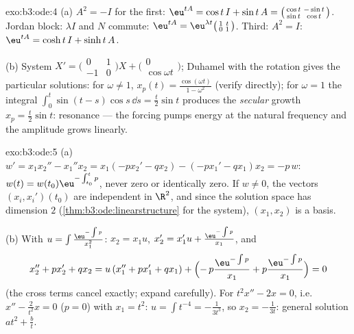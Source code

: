 \begin{solution}{exo:b3:ode:4}
(a) $A^2 = -I$ for the first: $\eu^{tA} = \cos t\,I + \sin
t\,A = \bigl(\begin{smallmatrix}\cos t & -\sin t\\ \sin t &
\cos t\end{smallmatrix}\bigr)$. Jordan block: $\lambda I$ and
$N$ commute: $\eu^{tA} =
\eu^{\lambda t}\bigl(\begin{smallmatrix}1 & t\\ 0 &
1\end{smallmatrix}\bigr)$. Third: $A^2 = I$: $\eu^{tA} =
\cosh t\,I + \sinh t\,A$.

(b) System $X' = \bigl(\begin{smallmatrix}0&1\\-1&0
\end{smallmatrix}\bigr)X + \bigl(\begin{smallmatrix}0\\
\cos\omega t\end{smallmatrix}\bigr)$; Duhamel with the
rotation  gives the particular solutions: for
$\omega \neq 1$, $x_p(t) = \frac{\cos(\omega t)}{1 -
\omega^2}$ (verify directly); for $\omega = 1$ the integral
$\int_0^t\sin(t - s)\cos s\,\dd s = \frac t2\sin t$ produces
the \emph{secular} growth $x_p = \frac t2\sin t$: resonance
--- the forcing pumps energy at the natural frequency and the
amplitude grows linearly.
\end{solution}

\begin{solution}{exo:b3:ode:5}
(a) $w' = x_1x_2'' - x_1''x_2 = x_1(-px_2' - qx_2) - (-px_1'
- qx_1)x_2 = -p\,w$: $w(t) = w(t_0)\eu^{-\int_{t_0}^tp}$,
never zero or identically zero. If $w \neq 0$, the vectors
$(x_i, x_i')(t_0)$ are independent in $\R^2$, and since the
solution space has dimension $2$
(\cref{thm:b3:ode:linearstructure} for the system), $(x_1,
x_2)$ is a basis.

(b) With $u = \int\frac{\eu^{-\int p}}{x_1^2}$: $x_2 = x_1u$,
$x_2' = x_1'u + \frac{\eu^{-\int p}}{x_1}$, and
\[
x_2'' + px_2' + qx_2
= u\,(x_1'' + px_1' + qx_1) +
\Bigl(-\,p\frac{\eu^{-\int p}}{x_1} +
p\frac{\eu^{-\int p}}{x_1}\Bigr) = 0
\]
(the cross terms cancel exactly; expand carefully). For
$t^2x'' - 2x = 0$, i.e.\ $x'' - \frac2{t^2}x = 0$ ($p = 0$)
with $x_1 = t^2$: $u = \int t^{-4} = -\frac1{3t^3}$, so $x_2
= -\frac1{3t}$: general solution $at^2 + \frac bt$.
\end{solution}

